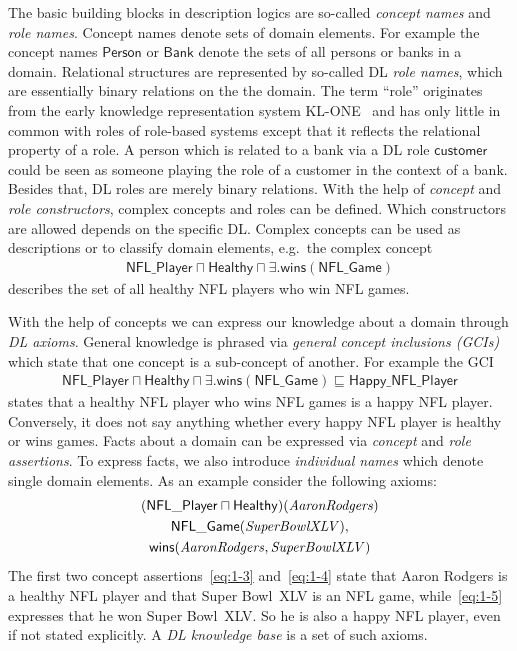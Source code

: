 The basic building blocks in description logics are so-called \emph{concept names} and \emph{role
  names}. Concept names denote sets of domain elements. For example the concept names
$\mathsf{Person}$ or $\mathsf{Bank}$ denote the sets of all persons or banks in a domain. Relational
structures are represented by so-called DL \emph{role names}, which are essentially binary relations
on the the domain. The term ``role'' originates from the early knowledge representation system
KL-ONE~\cite{WoS-CMA133} and has only little in common with roles of role-based systems except that
it reflects the relational property of a role. A person which is related to a bank via a DL role
$\mathsf{customer}$ could be seen as someone playing the role of a customer in the context of a
bank. Besides that, DL roles are merely binary relations. With the help of \emph{concept} and
\emph{role constructors}, complex concepts and roles can be defined.  Which constructors are allowed
depends on the specific DL. Complex concepts can be used as descriptions  or to
classify domain elements, e.g.\ the complex concept
\begin{align}
  \label{eq:1-1}
  \mathsf{NFL\_Player} \sqcap \mathsf{Healthy} \sqcap \exists.\mathsf{wins}(\mathsf{NFL\_Game})
\end{align}
describes the set of all healthy NFL players who win NFL games.

With the help of concepts we can express our knowledge about a domain through \emph{DL
  axioms}. General knowledge is phrased via \emph{general concept inclusions (GCIs)} which state
that one concept is a sub-concept of another. For example the GCI
\begin{align}
  \label{eq:1-2}
  \mathsf{NFL\_Player} \sqcap \mathsf{Healthy} \sqcap
  \exists.\mathsf{wins}(\mathsf{NFL\_Game}) \sqsubseteq \mathsf{Happy\_NFL\_Player}
\end{align}
states that a healthy NFL player who wins NFL games is a happy NFL player. Conversely, it does not say
anything whether every happy NFL player is healthy or wins games. Facts about a domain can be
expressed via \emph{concept} and \emph{role assertions}.  To express facts, we also introduce
\emph{individual names} which denote single domain elements. As an example consider the following axioms:
\begin{gather}
  (\mathsf{NFL\_Player} \sqcap \mathsf{Healthy})(\text{\textit{AaronRodgers}})\label{eq:1-3}\\
  \mathsf{NFL\_Game}(\text{\textit{SuperBowlXLV}}),\label{eq:1-4}\\
  \mathsf{\mathsf{wins}}(\text{\textit{AaronRodgers}},\text{\textit{SuperBowlXLV}})\label{eq:1-5}
\end{gather}
The first two concept assertions~\eqref{eq:1-3} and~\eqref{eq:1-4} state that Aaron Rodgers is a healthy NFL player and that Super Bowl~XLV is
an NFL game, while~\eqref{eq:1-5} expresses that he won Super Bowl~XLV. So he is also a happy
NFL player, even if not stated explicitly.  A \emph{DL knowledge base} is a set of such axioms.

